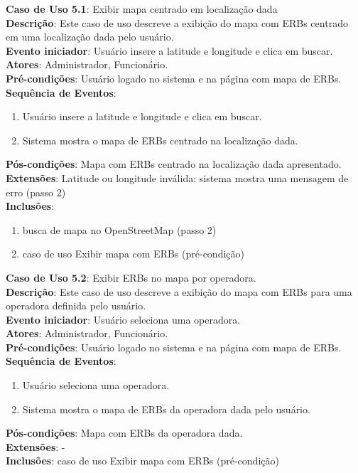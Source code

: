 \documentclass[]{politex}
\begin{document}
\noindent \textbf{Caso de Uso 5.1}: Exibir mapa centrado em localização dada \\
\textbf{Descrição}: Este caso de uso descreve a exibição do mapa com ERBs 
centrado em uma localização dada pelo usuário.  \\
\textbf{Evento iniciador}: Usuário insere a latitude e longitude e clica em buscar. \\
\textbf{Atores}: Administrador, Funcionário. \\
\textbf{Pré-condições}: Usuário logado no sistema e na página com mapa de ERBs. \\
\textbf{Sequência de Eventos}:
\begin{enumerate}
\item Usuário insere a latitude e longitude e clica em buscar.
\item Sistema mostra o mapa de ERBs centrado na localização dada.
\end{enumerate}
\textbf{Pós-condições}: Mapa com ERBs centrado na localização dada apresentado. \\
\textbf{Extensões}: Latitude ou longitude inválida: sistema mostra uma mensagem de erro (passo 2) \\
\textbf{Inclusões}:
\begin{enumerate}
\item busca de mapa no OpenStreetMap (passo 2)
\item caso de uso Exibir mapa com ERBs (pré-condição)
\end{enumerate}

\noindent \textbf{Caso de Uso 5.2}: Exibir ERBs no mapa por operadora. \\
\textbf{Descrição}: Este caso de uso descreve a exibição do mapa com ERBs para
uma operadora definida pelo usuário. \\
\textbf{Evento iniciador}: Usuário seleciona uma operadora. \\
\textbf{Atores}: Administrador, Funcionário. \\
\textbf{Pré-condições}: Usuário logado no sistema e na página com mapa de ERBs. \\
\textbf{Sequência de Eventos}:
\begin{enumerate}
\item Usuário seleciona uma operadora.
\item Sistema mostra o mapa de ERBs da operadora dada pelo usuário.
\end{enumerate}
\textbf{Pós-condições}: Mapa com ERBs da operadora dada. \\
\textbf{Extensões}: - \\
\textbf{Inclusões}: caso de uso Exibir mapa com ERBs (pré-condição) \\
\end{document}
